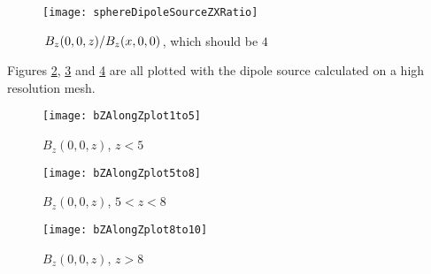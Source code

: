 \documentclass[11pt]{article}
\begin{document}
\begin{figure}[htp]
	\centering
	\texttt{[image: sphereDipoleSourceZXRatio]}
	\caption{$\flatfrac{B_z(0, 0, z)}{B_z(x, 0, 0)}$, which should be $4$ \label{fig:dipoleSourceAnisotropy}}
\end{figure}

Figures \ref{fig:bZZplotx1to5}, \ref{fig:bZZplotx5to8} and \ref{fig:bZZplotx8to10} are all plotted with the dipole
source calculated on a high resolution mesh.

\begin{figure}[htp]
	\centering
	\texttt{[image: bZAlongZplot1to5]}
	\caption{$B_z(0, 0, z)$, $z < 5$ \label{fig:bZZplotx1to5}}
\end{figure}

\begin{figure}[htp]
	\centering
	\texttt{[image: bZAlongZplot5to8]}
	\caption{$B_z(0, 0, z)$, $5 < z < 8$\label{fig:bZZplotx5to8}}
\end{figure}

\begin{figure}[htp]
	\centering
	\texttt{[image: bZAlongZplot8to10]}
	\caption{$B_z(0, 0, z)$, $z > 8$ \label{fig:bZZplotx8to10}}
\end{figure}
\end{document}
